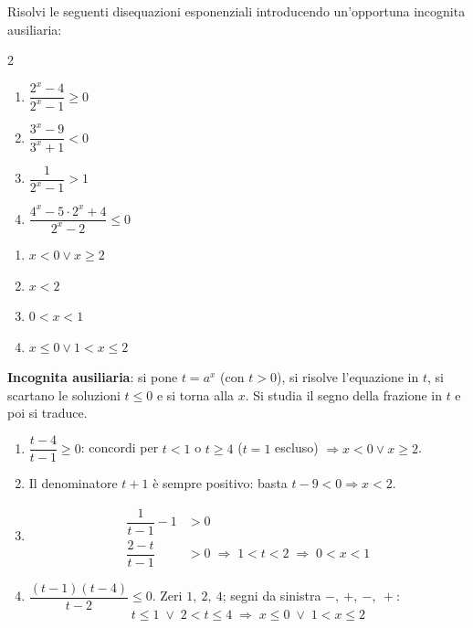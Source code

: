 
\begin{question}[ID=5.9, subtitle={Disequazioni con sostituzione: forme fratte}, difficulty=difficile, tags={disequazioni, esponenziali, sostituzione, fratte}]
Risolvi le seguenti disequazioni esponenziali introducendo un'opportuna incognita ausiliaria:
\begin{center}\begin{minipage}{0.92\linewidth}
\begin{multicols}{2}
\begin{enumerate}[leftmargin=3.2cm]
\item $\dfrac{2^{x}-4}{2^{x}-1} \geq 0$
\item $\dfrac{3^{x}-9}{3^{x}+1} < 0$
\item $\dfrac{1}{2^{x}-1} > 1$
\item $\dfrac{4^{x} - 5 \cdot 2^{x} + 4}{2^{x}-2} \leq 0$
\end{enumerate}
\end{multicols}
\end{minipage}\end{center}
\begin{solution}
\begin{enumerate}
    \item $x<0\vee x\geq2$
    \item $x<2$
    \item $0<x<1$
    \item $x\leq0\vee1<x\leq2$
\end{enumerate}
\end{solution}
\begin{explanation}
\textbf{Incognita ausiliaria}: si pone $t=a^x$ (con $t>0$), si risolve l'equazione in $t$, si scartano le soluzioni $t\leq0$ e si torna alla $x$.
Si studia il segno della frazione in $t$ e poi si traduce.
\begin{enumerate}
    \item $\dfrac{t-4}{t-1}\geq0$: concordi per $t<1$ o $t\geq4$ ($t=1$ escluso) $\Rightarrow x<0 \vee x\geq2$.
    \item Il denominatore $t+1$ è sempre positivo: basta $t-9<0 \Rightarrow x<2$.
    \item \[\begin{aligned}
    \dfrac{1}{t-1}-1 &> 0\\
    \dfrac{2-t}{t-1} &> 0 \;\Rightarrow\; 1<t<2 \;\Rightarrow\; 0<x<1
    \end{aligned}\]
    \item $\dfrac{(t-1)(t-4)}{t-2}\leq0$. Zeri $1,\ 2,\ 4$; segni da sinistra $-,\ +,\ -,\ +$:
    \[ t\leq1 \;\vee\; 2<t\leq4 \;\Rightarrow\; x\leq0 \;\vee\; 1<x\leq2 \]
\end{enumerate}
\end{explanation}
\end{question}

